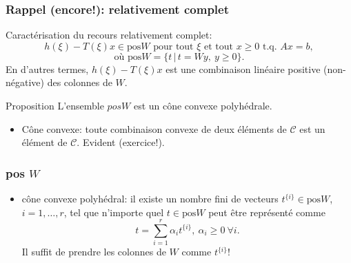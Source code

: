 \begin{frame}
	\frametitle{Rappel (encore!): relativement complet}
	
	Caractérisation du recours relativement complet:
	\[
	h(\xi) - T(\xi)x \in \mbox{pos}W \mbox{ pour tout } \xi \mbox{ et tout
	}x \geq 0 \mbox{ t.q. } Ax=b,
	\]
	\[
	\mbox{où pos}W = \lbrace t \,|\, t = Wy,\ y \geq 0 \rbrace.
	\]
	En d'autres termes, $h(\xi) - T(\xi)x$ est une combinaison linéaire
	positive (non-négative) des colonnes de $W$.
	
	\begin{block}{Proposition}
		L'ensemble $pos W$
		est un cône convexe polyhédrale.
	\end{block}
	
	\begin{itemize}
		\item
		Cône convexe: toute combinaison convexe de deux éléments de
		$\mathcal{C}$ est un élément de $\mathcal{C}$. Evident (exercice!).
	\end{itemize}
	
	
\end{frame}

\begin{frame}
	\frametitle{pos $W$}
	
	\begin{itemize}
		\item
		cône convexe polyhédral: il existe un nombre fini de vecteurs
		$t^{\lbrace i \rbrace} \in \mbox{pos}W$, $i = 1,\ldots,r$, tel que
		n'importe quel $t \in \mbox{pos}W$ peut être représenté comme
		\[
		t = \sum_{i=1}^r \alpha_i t^{\lbrace i \rbrace},\ \alpha_i \geq 0\
		\forall i.
		\]
		Il suffit de prendre les colonnes de $W$ comme $t^{\lbrace i \rbrace}$!
	\end{itemize}
	
	
\end{frame}

